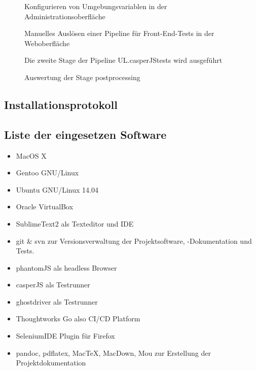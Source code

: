 \begin{figure}[htb]
\centering
{}
\caption{Konfigurieren von Umgebungsvariablen in der Administrationsoberfläche}
\label{fig:goguienvvars}
\end{figure}


 \begin{figure}[htb]
\centering
{}
\caption{Manuelles Auslösen einer Pipeline für Front-End-Tests in der Weboberfläche}
\label{fig:goguitrigger}
\end{figure}



\begin{figure}[htb]
\centering
{}
\caption{Die zweite Stage  der Pipeline UL.casperJStests wird ausgeführt}
\label{fig:goguistagedetail}
\end{figure}

\begin{figure}[htb]
\centering

\caption{Auswertung der Stage postprocessing }
\label{fig:goguisummary}
\end{figure}

\clearpage
  \subsection{Installationsprotokoll}\label{installprotocoll}
  
  \clearpage

\subsection{Liste der eingesetzen
Software}\label{liste-der-eingesetzen-software}

\begin{itemize}
\itemsep1pt\parskip0pt
\item
  MacOS X
\item
  Gentoo GNU/Linux
\item
  Ubuntu GNU/Linux 14.04
\item
  Oracle VirtualBox
\item
  SublimeText2 als Texteditor und \acs{IDE}
\item
  git \& svn zur Versionsverwaltung der Projektsoftware, -Dokumentation
  und Tests.
\item
  phantomJS als headless Browser
\item
  casperJS als Testrunner
\item
  ghostdriver als Testrunner
\item
  Thoughtworks Go also CI/CD Platform
\item
  SeleniumIDE Plugin für Firefox
\item
  pandoc, pdflatex, MacTeX, MacDown, Mou zur Erstellung der
  Projektdokumentation
\end{itemize}

